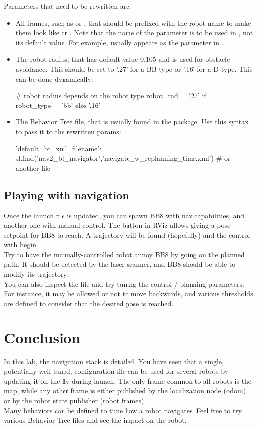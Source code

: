 \documentclass{ecnreport}
\begin{document}
Parameters that need to be rewritten are:
\begin{itemize}
 \item All frames, such as  or , that should be prefixed with the robot name to make them look like  or . Note that the name of the parameter is to be used in , not its default value. For example,  usually appears as the  parameter in .
 \item The robot radius, that has default value 0.105 and is used for obstacle avoidance. This should be set to '.27' for a BB-type or '.16' for a D-type. This can be done dynamically:
\begin{pythoncodelarge}
# robot radius depends on the robot type
robot_rad = '.27' if robot_type=='bb' else '.16'
\end{pythoncodelarge}
\item The Behavior Tree file, that is usually found in the  package. Use this syntax to pass it to the rewritten params:
\begin{pythoncode}
 'default_bt_xml_filename': sl.find('nav2_bt_navigator','navigate_w_replanning_time.xml')   # or another file
\end{pythoncode}
\end{itemize}

\subsection{Playing with navigation}

Once the launch file is updated, you can spawn BB8 with nav capabilities, and another one with manual control. The  button in RViz allows giving a pose setpoint for BB8 to reach. A trajectory will be found (hopefully) and the control with begin.\\

Try to have the manually-controlled robot annoy BB8 by going on the planned path. It should be detected by the laser scanner, and BB8 should be able to modify its trajectory.\\

You can also inspect the  file and try tuning the control / planning parameters. For instance, it may be allowed or not to move backwards, and various thresholds are defined to consider that the desired pose is reached.


\section{Conclusion}

In this lab, the navigation stack is detailed. You have seen that a single, potentially well-tuned, configuration file can be used for several robots by updating it on-the-fly during launch. The only frame common to all robots is the map, while any other frame is either published by the localization node (odom) or by the robot state publisher (robot frames). \\

Many behaviors can be defined to tune how a robot navigates. Feel free to try various Behavior Tree files and see the impact on the robot.
\end{document}
